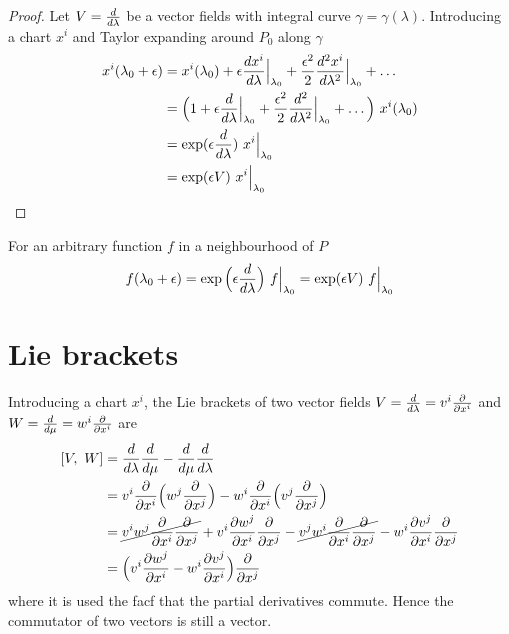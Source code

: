     \begin{proof}
        Let $V = \frac{d}{d\lambda}$ be a vector fields with integral curve $\gamma = \gamma (\lambda)$. Introducing a chart $x^i$ and Taylor expanding around $P_0$ along $\gamma$
        \begin{equation*}
        \begin{aligned}
            x^i(\lambda_0 + \epsilon) & = x^i(\lambda_0) + \epsilon \frac{dx^i}{d\lambda} \Big\vert_{\lambda_0} + \frac{\epsilon^2}{2} \frac{d^2x^i}{d\lambda^2} \Big\vert_{\lambda_0} + \ldots \\ & = \Big (1 + \epsilon \frac{d}{d\lambda} \Big\vert_{\lambda_0} + \frac{\epsilon^2}{2} \frac{d^2}{d\lambda^2} \Big\vert_{\lambda_0} + \ldots \Big) ~ x^i(\lambda_0) \\ & = \exp(\epsilon \frac{d}{d\lambda}) ~ x^i \Big\vert_{\lambda_0} \\ & = \exp(\epsilon V) ~ x^i \Big\vert_{\lambda_0} 
        \end{aligned}
        \end{equation*}
    \end{proof}
    
    For an arbitrary function $f$ in a neighbourhood of $P$
    \begin{equation*}
        f(\lambda_0 + \epsilon) = \exp \Big(\epsilon \frac{d}{d\lambda} \Big) ~ f \Big\vert_{\lambda_0} = \exp (\epsilon V ) ~ f \Big\vert_{\lambda_0}
    \end{equation*}

\section{Lie brackets}

    Introducing a chart $x^i$, the Lie brackets of two vector fields $V = \frac{d}{d\lambda} = v^i \frac{\partial}{\partial x^i}$ and $W = \frac{d}{d\mu} = w^i \frac{\partial}{\partial x^i}$ are 
    \begin{equation*}
    \begin{aligned}
        [V, ~W] & = \dv{}{\lambda} \dv{}{\mu} - \dv{}{\mu} \dv{}{\lambda} \\ & = v^i \pdv{}{x^i} \Big( w^j \pdv{}{x^j} \Big) - w^i \pdv{}{x^i} \Big( v^j \pdv{}{x^j} \Big) \\ & = \cancel{v^i w^j \pdv{}{x^i} \pdv{}{x^j}} + v^i \pdv{w^j}{x^i} \pdv{}{x^j} - \cancel{v^j w^i \pdv{}{x^i} \pdv{}{x^j}} - w^i \pdv{v^j}{x^i} \pdv{}{x^j} \\ & = \Big ( v^i \pdv{w^j}{x^i} - w^i \pdv{v^j}{x^i} \Big ) \pdv{}{x^j} 
    \end{aligned}
    \end{equation*}
    where it is used the facf that the partial derivatives commute. Hence the commutator of two vectors is still a vector. 

